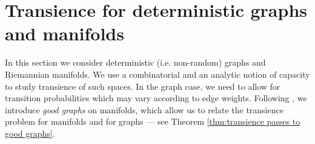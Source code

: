 \documentclass{amsart}
\newcommand{\MM}{\mathbb{M}}
\newcommand{\MP}{\mathbb{PM}}
\newcommand{\DelanGraph}{\mathcal{DG}}
\theoremstyle{plain}
\numberwithin{equation}{section}
\theoremstyle{definition}
\newtheorem{definition}[theorem]{Definition}
\begin{document}





\section{Transience for deterministic graphs and manifolds}
\label{sec:transience for deterministic}

In this section we consider deterministic (i.e. non-random) graphs and Riemannian manifolds. We use a combinatorial and an analytic notion of capacity to study transience of such spaces. In the graph case, we need to allow for transition probabilities which may vary according to edge weights.
Following \cite{gurel2017recurrence},  we introduce \emph{good graphs} on manifolds, which allow us to relate the transience problem for manifolds and for graphs --- see Theorem \ref{thm:transience passes to good graphs}.
\end{document}
